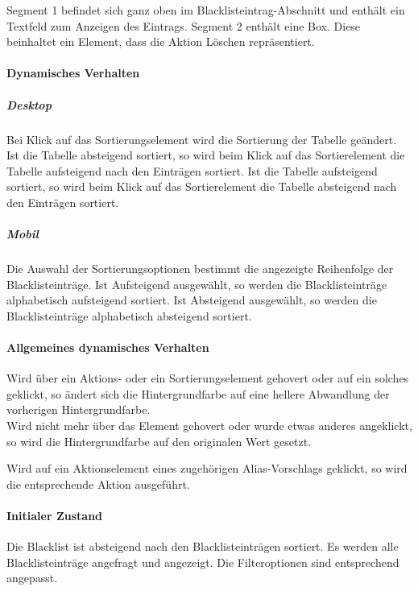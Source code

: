 Segment 1 befindet sich ganz oben im Blacklisteintrag-Abschnitt und enthält ein Textfeld zum Anzeigen des Eintrags.
Segment 2 enthält eine Box. Diese beinhaltet ein Element, dass die Aktion \dq Löschen \dq{} repräsentiert.

\paragraph*{Dynamisches Verhalten}
\subparagraph*{Desktop}
Bei Klick auf das Sortierungselement wird die Sortierung der Tabelle geändert.
Ist die Tabelle absteigend sortiert, so wird beim Klick auf das Sortierelement die Tabelle aufsteigend nach den Einträgen sortiert.
Ist die Tabelle aufsteigend sortiert, so wird beim Klick auf das Sortierelement die Tabelle absteigend nach den Einträgen sortiert.

\subparagraph*{Mobil}
Die Auswahl der Sortierungsoptionen bestimmt die angezeigte Reihenfolge der Blacklisteinträge.
Ist \dq Aufsteigend \dq{} ausgewählt, so werden die Blacklisteinträge alphabetisch aufsteigend sortiert.
Ist \dq Absteigend \dq{} ausgewählt, so werden die Blacklisteinträge alphabetisch absteigend sortiert.

\paragraph*{Allgemeines dynamisches Verhalten}
Wird über ein Aktions- oder ein Sortierungselement gehovert oder auf ein solches geklickt, so ändert sich die Hintergrundfarbe auf eine hellere Abwandlung der vorherigen Hintergrundfarbe. \\
Wird nicht mehr über das Element gehovert oder wurde etwas anderes angeklickt, so wird die Hintergrundfarbe auf den originalen Wert gesetzt.

Wird auf ein Aktionselement eines zugehörigen Alias-Vorschlags geklickt, so wird die entsprechende Aktion ausgeführt.

\paragraph*{Initialer Zustand}
Die Blacklist ist absteigend nach den Blacklisteinträgen sortiert.
Es werden alle Blacklisteinträge angefragt und angezeigt.
Die Filteroptionen sind entsprechend angepasst.